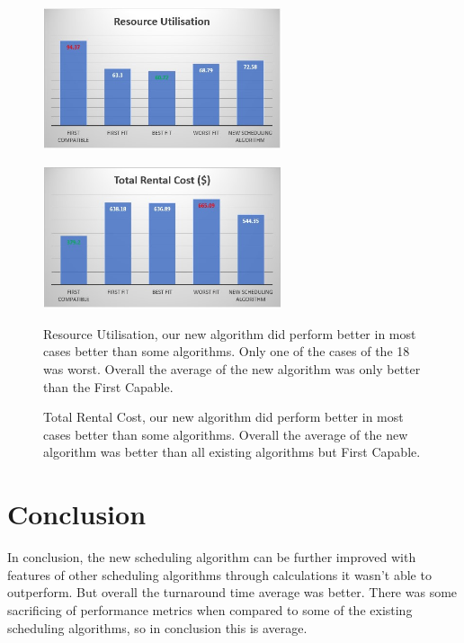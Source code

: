 \documentclass[a4paper]{article} %
\begin{document}
\begin{figure}
\centering
    \begin{minipage}{.5\textwidth}
      \centering
        \includegraphics[width=7cm]{images/ResourceUtilizationDiagram.jpg}
      \label{fig:test1}
    \end{minipage}%
    \begin{minipage}{.5\textwidth}
      \centering
        \includegraphics[width=7cm]{images/TotalRentalCostDiagram.jpg}
      \label{fig:test2}
    \end{minipage}
    \begin{flushleft}
        Resource Utilisation, our new algorithm did perform better in most cases better than some algorithms. Only one of the cases of the 18 was worst. Overall the average of the new algorithm was only better than the First Capable.
        \medskip
        
        Total Rental Cost, our new algorithm did perform better in most cases better than some algorithms. Overall the average of the new algorithm was better than all existing algorithms but First Capable.
    \end{flushleft}
\end{figure}

\break
\section{Conclusion}
In conclusion, the new scheduling algorithm can be further improved with features of other scheduling algorithms through calculations it wasn't able to outperform. But overall the turnaround time average was better. There was some sacrificing of performance metrics when compared to some of the existing scheduling algorithms, so in conclusion this is average.
\end{document}
